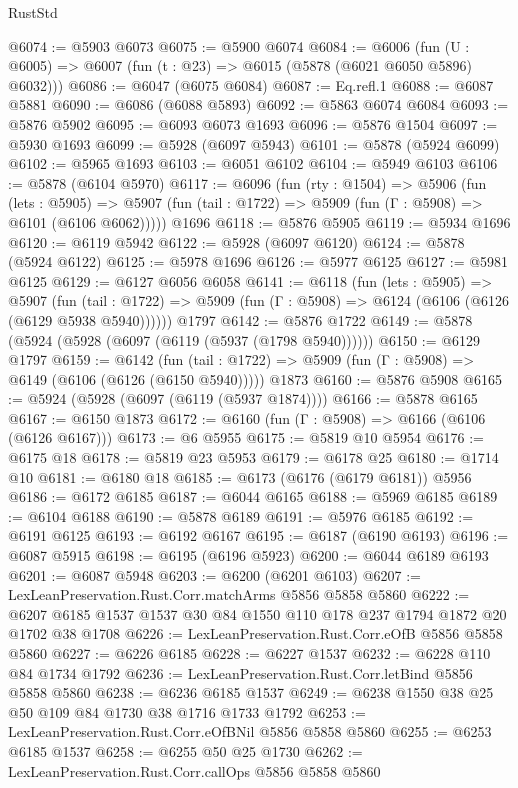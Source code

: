 \begin{lexlean}{RustStd}
\begin{coremodule}
@6074 := @5903 @6073
@6075 := @5900 @6074
@6084 := @6006 (fun (U : @6005) => @6007 (fun (t : @23) => @6015 (@5878 (@6021 @6050 @5896) @6032)))
@6086 := @6047 (@6075 @6084)
@6087 := Eq.refl.{1}
@6088 := @6087 @5881
@6090 := @6086 (@6088 @5893)
@6092 := @5863 @6074 @6084
@6093 := @5876 @5902
@6095 := @6093 @6073 @1693
@6096 := @5876 @1504
@6097 := @5930 @1693
@6099 := @5928 (@6097 @5943)
@6101 := @5878 (@5924 @6099)
@6102 := @5965 @1693
@6103 := @6051 @6102
@6104 := @5949 @6103
@6106 := @5878 (@6104 @5970)
@6117 := @6096
    (fun (rty : @1504) =>
    @5906
      (fun (lets : @5905) =>
      @5907 (fun (tail : @1722) => @5909 (fun (Γ : @5908) => @6101 (@6106 @6062)))))
    @1696
@6118 := @5876 @5905
@6119 := @5934 @1696
@6120 := @6119 @5942
@6122 := @5928 (@6097 @6120)
@6124 := @5878 (@5924 @6122)
@6125 := @5978 @1696
@6126 := @5977 @6125
@6127 := @5981 @6125
@6129 := @6127 @6056 @6058
@6141 := @6118
    (fun (lets : @5905) =>
    @5907
      (fun (tail : @1722) => @5909 (fun (Γ : @5908) => @6124 (@6106 (@6126 (@6129 @5938 @5940))))))
    @1797
@6142 := @5876 @1722
@6149 := @5878 (@5924 (@5928 (@6097 (@6119 (@5937 (@1798 @5940))))))
@6150 := @6129 @1797
@6159 := @6142
    (fun (tail : @1722) => @5909 (fun (Γ : @5908) => @6149 (@6106 (@6126 (@6150 @5940)))))
    @1873
@6160 := @5876 @5908
@6165 := @5924 (@5928 (@6097 (@6119 (@5937 @1874))))
@6166 := @5878 @6165
@6167 := @6150 @1873
@6172 := @6160 (fun (Γ : @5908) => @6166 (@6106 (@6126 @6167)))
@6173 := @6 @5955
@6175 := @5819 @10 @5954
@6176 := @6175 @18
@6178 := @5819 @23 @5953
@6179 := @6178 @25
@6180 := @1714 @10
@6181 := @6180 @18
@6185 := @6173 (@6176 (@6179 @6181)) @5956
@6186 := @6172 @6185
@6187 := @6044 @6165
@6188 := @5969 @6185
@6189 := @6104 @6188
@6190 := @5878 @6189
@6191 := @5976 @6185
@6192 := @6191 @6125
@6193 := @6192 @6167
@6195 := @6187 (@6190 @6193)
@6196 := @6087 @5915
@6198 := @6195 (@6196 @5923)
@6200 := @6044 @6189 @6193
@6201 := @6087 @5948
@6203 := @6200 (@6201 @6103)
@6207 := LexLeanPreservation.Rust.Corr.matchArms @5856 @5858 @5860
@6222 := @6207 @6185 @1537 @1537 @30 @84 @1550 @110 @178 @237 @1794 @1872 @20 @1702 @38 @1708
@6226 := LexLeanPreservation.Rust.Corr.eOfB @5856 @5858 @5860
@6227 := @6226 @6185
@6228 := @6227 @1537
@6232 := @6228 @110 @84 @1734 @1792
@6236 := LexLeanPreservation.Rust.Corr.letBind @5856 @5858 @5860
@6238 := @6236 @6185 @1537
@6249 := @6238 @1550 @38 @25 @50 @109 @84 @1730 @38 @1716 @1733 @1792
@6253 := LexLeanPreservation.Rust.Corr.eOfBNil @5856 @5858 @5860
@6255 := @6253 @6185 @1537
@6258 := @6255 @50 @25 @1730
@6262 := LexLeanPreservation.Rust.Corr.callOps @5856 @5858 @5860

\end{coremodule}
\end{lexlean}
